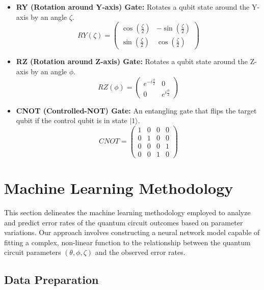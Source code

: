 \documentclass{article}
\begin{document}
\begin{multicols}{2}
\begin{itemize}
        \item \textbf{RY (Rotation around Y-axis) Gate:} Rotates a qubit state around the Y-axis by an angle $\zeta$.
        \[
        RY(\zeta) = 
        \begin{pmatrix}
            \cos\left(\frac{\zeta}{2}\right) & -\sin\left(\frac{\zeta}{2}\right) \\
            \sin\left(\frac{\zeta}{2}\right) & \cos\left(\frac{\zeta}{2}\right)
        \end{pmatrix}
        \]
        
        \item \textbf{RZ (Rotation around Z-axis) Gate:} Rotates a qubit state around the Z-axis by an angle $\phi$.
        \[
        RZ(\phi) = 
        \begin{pmatrix}
            e^{-i\frac{\phi}{2}} & 0 \\
            0 & e^{i\frac{\phi}{2}}
        \end{pmatrix}
        \]
        
        \item \textbf{CNOT (Controlled-NOT) Gate:} An entangling gate that flips the target qubit if the control qubit is in state $|1\rangle$.
        \[
        CNOT = 
        \begin{pmatrix}
            1 & 0 & 0 & 0 \\
            0 & 1 & 0 & 0 \\
            0 & 0 & 0 & 1 \\
            0 & 0 & 1 & 0
        \end{pmatrix}
        \]
    \end{itemize}


\section{Machine Learning Methodology}

    This section delineates the machine learning methodology employed to analyze and predict error rates of the quantum circuit outcomes based on parameter variations. Our approach involves constructing a neural network model capable of fitting a complex, non-linear function to the relationship between the quantum circuit parameters \((\theta, \phi, \zeta)\) and the observed error rates.
    
\subsection{Data Preparation}
    

\end{multicols}
\end{document}
